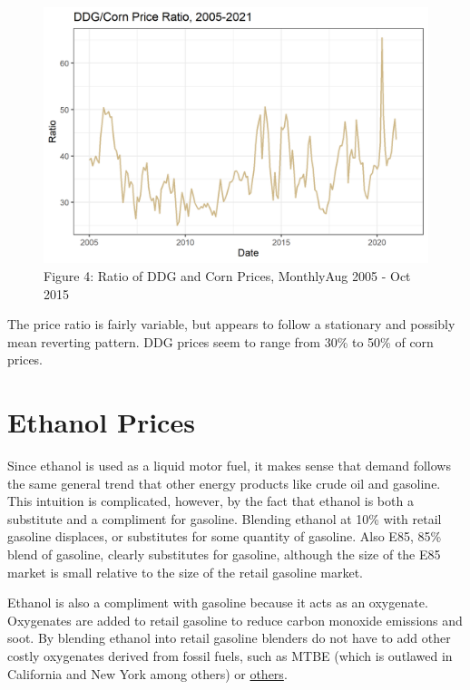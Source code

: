 \documentclass[
]{book}
\begin{document}
\begin{figure}
\centering
\includegraphics{assets/DDGCORNRatio.png}
\caption{Figure 4: Ratio of DDG and Corn Prices, MonthlyAug 2005 - Oct 2015}
\end{figure}

The price ratio is fairly variable, but appears to follow a stationary and possibly mean reverting pattern. DDG prices seem to range from 30\% to 50\% of corn prices.

\hypertarget{ethanol-prices}{%
\section{Ethanol Prices}\label{ethanol-prices}}

Since ethanol is used as a liquid motor fuel, it makes sense that demand follows the same general trend that other energy products like crude oil and gasoline. This intuition is complicated, however, by the fact that ethanol is both a substitute and a compliment for gasoline. Blending ethanol at 10\% with retail gasoline displaces, or substitutes for some quantity of gasoline. Also E85, 85\% blend of gasoline, clearly substitutes for gasoline, although the size of the E85 market is small relative to the size of the retail gasoline market.

Ethanol is also a compliment with gasoline because it acts as an oxygenate. Oxygenates are added to retail gasoline to reduce carbon monoxide emissions and soot. By blending ethanol into retail gasoline blenders do not have to add other costly oxygenates derived from fossil fuels, such as MTBE (which is outlawed in California and New York among others) or \href{https://en.wikipedia.org/wiki/Oxygenate}{others}.
\end{document}
